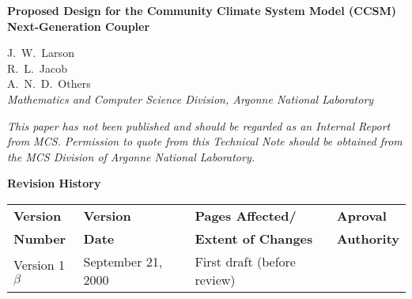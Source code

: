 \documentclass{article}
\begin{document}
\begin{sloppypar}
{\huge\bf
Proposed Design for the Community Climate System Model (CCSM)
Next-Generation Coupler
\\ }                     %
\end{sloppypar}

\vspace{.3in}
             J.~W.~Larson\\
             R.~L.~Jacob\\
             A.~N.~D.~Others\\
\vspace{.2in} {\em Mathematics and Computer Science Division,
Argonne National Laboratory\\}

\vfill

{\em This paper has not been published and should  be regarded as
an Internal Report from MCS. Permission to quote from this
Technical Note should be  obtained from the MCS Division of
Argonne National Laboratory.}

\vspace{0.4in}


\thispagestyle{empty}
\newpage




\newpage
\setcounter{page}{2}     %


\vspace*{\fill}

\centerline{\huge\bf Revision History}

\bigskip
{}

\begin{center}
\begin{tabular}{|l|l|l|l|}\hline
{\bf Version} & {\bf Version} & {\bf Pages Affected/}   & {\bf Aproval}\\
{\bf Number}  & {\bf Date}    & {\bf Extent of Changes} & {\bf Authority}\\
\hline\hline Version 1$\beta$ & September 21, 2000      & First
draft (before review) &\\\hline
\end{tabular}
\end{center}
\end{document}
